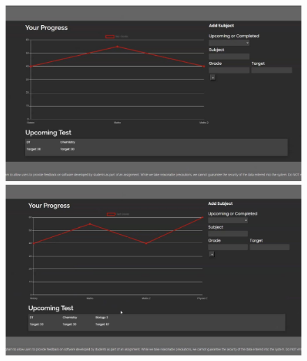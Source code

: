 \documentclass[a4paper]{article}
\begin{document}
\begin{figure}[H]
  \centering
  \begin{minipage}{0.49\textwidth}
    \centering
    \includegraphics[width=\linewidth]{./image/history_1.png}
  \end{minipage}\hfill
  \begin{minipage}{0.49\textwidth}
    \centering
    \includegraphics[width=\linewidth]{./image/history_2.png}
  \end{minipage}
\end{figure}
\end{document}
